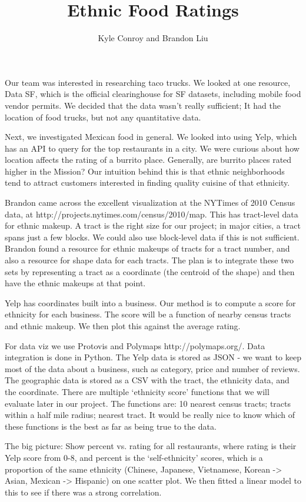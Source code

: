 \documentclass[12pt,letterpaper]{report}
\author{Kyle Conroy and Brandon Liu}
\title{Ethnic Food Ratings}
\begin{document}
\maketitle
\doublespacing

Our team was interested in researching taco trucks. We looked at one resource, Data SF, which is the official clearinghouse for SF datasets, including mobile food vendor permits. We decided that the data wasn’t really sufficient; It had the location of food trucks, but not any quantitative data.

Next, we investigated Mexican food in general. We looked into using Yelp, which has an API to query for the top restaurants in a city. We were curious about how location affects the rating of a burrito place. Generally, are burrito places rated higher in the Mission? Our intuition behind this is that ethnic neighborhoods tend to attract customers interested in finding quality cuisine of that ethnicity.

Brandon came across the excellent visualization at the NYTimes of 2010 Census data, at http://projects.nytimes.com/census/2010/map. This has tract-level data for ethnic makeup. A tract is the right size for our project; in major cities, a tract spans just a few blocks. We could also use block-level data if this is not sufficient. Brandon found a resource for ethnic makeups of tracts for a tract number, and also a resource for shape data for each tracts. The plan is to integrate these two sets by representing a tract as a coordinate (the centroid of the shape) and then have the ethnic makeups at that point.

Yelp has coordinates built into a business. Our method is to compute a score for ethnicity for each business. The score will be a function of nearby census tracts and ethnic makeup. We then plot this against the average rating.

For data viz we use Protovis and Polymaps http://polymaps.org/. Data integration is done in Python. The Yelp data is stored as JSON - we want to keep most of the data about a business, such as category, price and number of reviews. The geographic data is stored as a CSV with the tract, the ethnicity data, and the coordinate. There are multiple ‘ethnicity score’ functions that we will evaluate later in our project. The functions are: 10 nearest census tracts; tracts within a half mile radius; nearest tract. It would be really nice to know which of these functions is the best as far as being true to the data.

The big picture: Show percent vs. rating for all restaurants, where rating is their Yelp score from 0-8, and percent is the ‘self-ethnicity’ scores, which is a proportion of the same ethnicity (Chinese, Japanese, Vietnamese, Korean -> Asian, Mexican -> Hispanic) on one scatter plot. We then fitted a linear model to this to see if there was a strong correlation.
\end{document}
